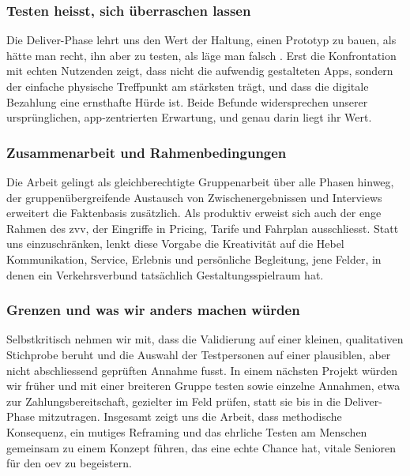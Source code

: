 \subsubsection{Testen heisst, sich überraschen lassen}
Die Deliver-Phase lehrt uns den Wert der Haltung, einen Prototyp zu bauen, als hätte man recht, ihn aber zu testen, als läge man falsch \parencite{leifer2015}. Erst die Konfrontation mit echten Nutzenden zeigt, dass nicht die aufwendig gestalteten Apps, sondern der einfache physische Treffpunkt am stärksten trägt, und dass die digitale Bezahlung eine ernsthafte Hürde ist. Beide Befunde widersprechen unserer ursprünglichen, app-zentrierten Erwartung, und genau darin liegt ihr Wert.

\subsubsection{Zusammenarbeit und Rahmenbedingungen}
Die Arbeit gelingt als gleichberechtigte Gruppenarbeit über alle Phasen hinweg, der gruppenübergreifende Austausch von Zwischenergebnissen und Interviews erweitert die Faktenbasis zusätzlich. Als produktiv erweist sich auch der enge Rahmen des \gls{zvv}, der Eingriffe in Pricing, Tarife und Fahrplan ausschliesst. Statt uns einzuschränken, lenkt diese Vorgabe die Kreativität auf die Hebel Kommunikation, Service, Erlebnis und persönliche Begleitung, jene Felder, in denen ein Verkehrsverbund tatsächlich Gestaltungsspielraum hat.

\subsubsection{Grenzen und was wir anders machen würden}
Selbstkritisch nehmen wir mit, dass die Validierung auf einer kleinen, qualitativen Stichprobe beruht und die Auswahl der Testpersonen auf einer plausiblen, aber nicht abschliessend geprüften Annahme fusst. In einem nächsten Projekt würden wir früher und mit einer breiteren Gruppe testen sowie einzelne Annahmen, etwa zur Zahlungsbereitschaft, gezielter im Feld prüfen, statt sie bis in die Deliver-Phase mitzutragen. Insgesamt zeigt uns die Arbeit, dass methodische Konsequenz, ein mutiges Reframing und das ehrliche Testen am Menschen gemeinsam zu einem Konzept führen, das eine echte Chance hat, vitale Senioren für den \gls{oev} zu begeistern.
